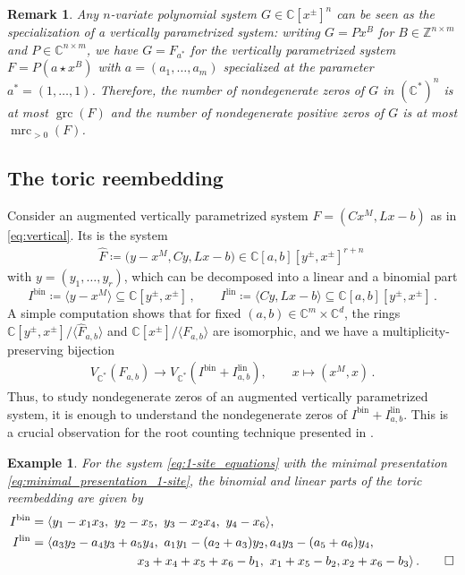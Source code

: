\documentclass[11pt,reqno,a4paper]{amsart}
\numberwithin{equation}{section}
\theoremstyle{theoremstyle}
\theoremstyle{examplestyle}
\newtheorem{example}[theorem]{Example}
\newtheorem{remark}[theorem]{Remark}
\newcommand{\CC}{\mathbb{C}}
\newcommand{\ZZ}{\mathbb{Z}}
\newcommand{\lin}{{\mathrm{lin}}}
\newcommand{\bin}{{\mathrm{bin}}}
\DeclareMathOperator{\grc}{grc}
\DeclareMathOperator{\mrc}{mrc}
\newcommand{\term}{\bfemph}
\begin{document}
\begin{remark}\label{rem:any_pol}
Any  $n$-variate polynomial system $G\in \CC[x^\pm]^n$ can be seen as the specialization of a vertically parametrized system: writing $G=Px^B$ for $B\in \ZZ^{n\times m}$ and $P\in \CC^{n\times m}$, we have $G=F_{a^*}$ for the vertically parametrized system $F=P (a \star x^B)$ with $a=(a_1,\dots,a_m)$ specialized at the parameter $a^*=(1,\dots,1)$. Therefore, the number of nondegenerate zeros of $G$ in $(\CC^*)^n$ is at most $\grc(F)$ and the number of nondegenerate positive zeros of $G$ is at most $\mrc_{>0}(F)$. 
\end{remark}

 


\subsection{The toric reembedding}\label{subsec:reembedding}
Consider an augmented vertically parametrized system $F=(Cx^M, Lx-b)$ as in \eqref{eq:vertical}. 
Its \term{toric reembedding} is the system
\begin{align}
\label{eq:monomial_reembedding}
   \widehat{F} \coloneqq \big( y -  x^{M} , C y  ,   Lx - b \big) \in \CC[a,b][y^\pm,x^\pm]^{r+n} \, 
\end{align}
with $y=(y_1,\dots,y_r)$, which can be 
decomposed into a linear and a binomial part
\begin{equation} \label{eq:monomial_linbin}
I^{\bin}\coloneqq \langle y - x^{M}  \rangle \subseteq \CC[y^\pm,x^\pm]\,, \qquad  I^{\lin} \coloneqq \langle C y  , Lx - b  \rangle \subseteq \CC[a,b][y^\pm,x^\pm]  \,.
\end{equation}
A simple computation shows that for fixed $(a,b)\in \CC^{m}\times\CC^d$, the rings $\CC[y^\pm,x^\pm]/\langle \widehat{F}_{a,b}\rangle$ and $\CC[x^\pm]/\langle F_{a,b}\rangle$ are isomorphic, and we have a multiplicity-preserving  bijection 
\begin{align}\label{eq:monomial_correspondence}
V_{\CC^*}(F_{a,b}) \to  V_{\CC^*}(I^{\bin}+I^{\lin}_{a,b}),\qquad x \mapsto  (x^M,x)\,.
\end{align}
Thus, to study nondegenerate zeros of an augmented vertically parametrized system, it is enough to understand the nondegenerate zeros of 
$I^{\bin}+I^{\lin}_{a,b}$. 
This is a crucial observation for the root counting technique presented in .

\begin{example}
For the system \eqref{eq:1-site_equations} with the minimal presentation \eqref{eq:minimal_presentation_1-site}, the binomial and linear parts of the toric reembedding are given by
\begin{align*}
I^{\bin}&=\langle y_1 - x_1x_3, \  y_2 - x_5,\   y_3 - x_2x_4, \  y_4 - x_6\rangle,\\
I^{\lin}&=\langle a_3y_2 - a_4y_3 + a_5y_4, \ 
a_1y_1 -(a_2+a_3)y_2, a_4y_3 - (a_5+a_6)y_4, \\ & \hspace{3cm} 
x_{3} + x_{4} + x_{5} + x_{6} - b_{1},\    x_{1} + x_{5} - b_{2},   x_{2} + x_{6} - b_{3}\rangle\,. \qedhere
\end{align*}
\end{example}
\end{document}
